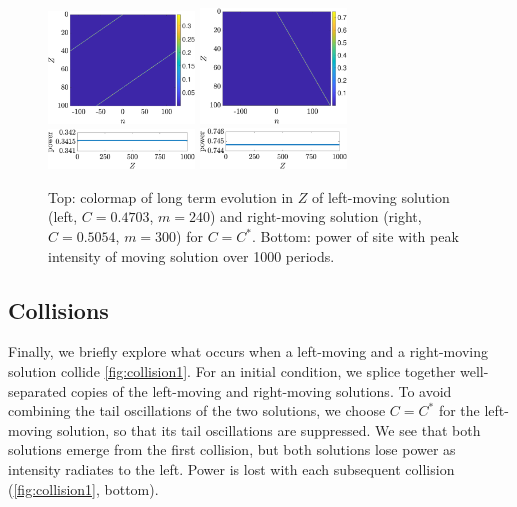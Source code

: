 \documentclass[reprint, amsmath,amssymb,aps,pre]{revtex4-2}
\begin{document}
\begin{figure}
    \centering
    \includegraphics[width=3.90cm]{leftlong.eps}
    \includegraphics[width=3.90cm]{rightlong.eps}
    \includegraphics[width=3.90cm]{leftperiods.eps}
    \includegraphics[width=3.90cm]{rightperiods.eps}
    \caption{Top: colormap of long term evolution in $Z$ of left-moving solution (left, $C=0.4703$, $m=240$) and right-moving solution (right, $C=0.5054$, $m=300$) for $C=C^*$. Bottom: power of site with peak intensity of moving solution over 1000 periods.}
    \label{fig:movelong}
\end{figure}

\subsection{Collisions}

Finally, we briefly explore what occurs when a left-moving and a right-moving solution collide \cref{fig:collision1}. For an initial condition, we splice together well-separated copies of the left-moving and right-moving solutions. To avoid combining the tail oscillations of the two solutions, we choose $C=C^*$ for the left-moving solution, so that its tail oscillations are suppressed. We see that both solutions emerge from the first collision, but both solutions lose power as intensity radiates to the left. Power is lost with each subsequent collision (\cref{fig:collision1}, bottom).
\end{document}
